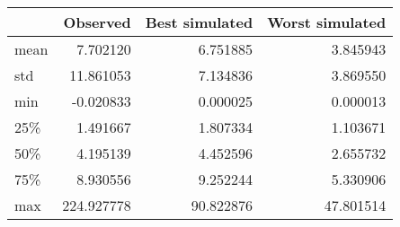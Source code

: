 \begin{tabular}{lrrr}
\toprule
{} &    Observed &  Best simulated &  Worst simulated \\
\midrule
mean &    7.702120 &        6.751885 &         3.845943 \\
std  &   11.861053 &        7.134836 &         3.869550 \\
min  &   -0.020833 &        0.000025 &         0.000013 \\
25\%  &    1.491667 &        1.807334 &         1.103671 \\
50\%  &    4.195139 &        4.452596 &         2.655732 \\
75\%  &    8.930556 &        9.252244 &         5.330906 \\
max  &  224.927778 &       90.822876 &        47.801514 \\
\bottomrule
\end{tabular}
